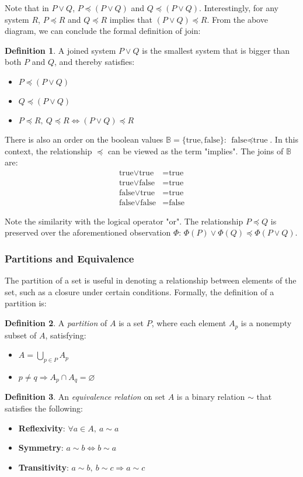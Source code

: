 \documentclass[12pt]{article}
\theoremstyle{definition}
\newtheorem{defn}{Definition}[section]
\newcommand{\T}{\text{true}}
\newcommand{\F}{\text{false}}
\begin{document}
	Note that in $P \lor Q$, $P \preceq (P \lor Q)$ and $Q \preceq (P \lor Q)$. Interestingly, for any system $R$, $P \preceq R$ and $Q \preceq R$ implies that $(P \lor Q) \preceq R$. From the above diagram, we can conclude the formal definition of join:
	\begin{defn}
		A joined system $P \lor Q$ is the smallest system that is bigger than both $P$ and $Q$, and thereby satisfies:
		\begin{itemize}
			\item $P \preceq (P \lor Q)$
			\item $Q \preceq (P \lor Q)$
			\item $P \preceq R,\ Q \preceq R \iff (P \lor Q) \preceq R$
		\end{itemize}
	\end{defn}
	
	There is also an order on the boolean values $\mathbb{B} = \{\T, \F\}$: $\F \preceq \T$. In this context, the relationship $\preceq$ can be viewed as the term "implies". The joins of $\mathbb{B}$ are:
	\begin{align*}
		\T \lor \T &= \T \\
		\T \lor \F &= \T \\
		\F \lor \T &= \T \\
		\F \lor \F &= \F
	\end{align*}
	
	Note the similarity with the logical operator "or".
	The relationship $P \preceq Q$ is preserved over the aforementioned observation $\Phi$: $\Phi(P) \lor \Phi(Q) \preceq \Phi(P \lor Q)$.
	
	\subsubsection{Partitions and Equivalence}
	
	The partition of a set is useful in denoting a relationship between elements of the set, such as a closure under certain conditions. Formally, the definition of a partition is:
	\begin{defn}
		A \emph{partition} of $A$ is a set $P$, where each element $A_p$ is a nonempty subset of $A$, satisfying:
		\begin{itemize}
			\item $A = \bigcup_{p \in P} A_p$
			\item $p \neq q \Rightarrow A_p \cap A_q = \varnothing$
		\end{itemize}
	\end{defn}
	\begin{defn}
		An \emph{equivalence relation} on set $A$ is a binary relation $\sim$ that satisfies the following:
		\begin{itemize}
			\item \textbf{Reflexivity}: $\forall a \in A,\ a \sim a$
			\item \textbf{Symmetry}: $a \sim b \iff b \sim a$
			\item \textbf{Transitivity}: $a \sim b,\ b \sim c \Rightarrow a \sim c$
		\end{itemize}
	\end{defn}
	
\end{document}
